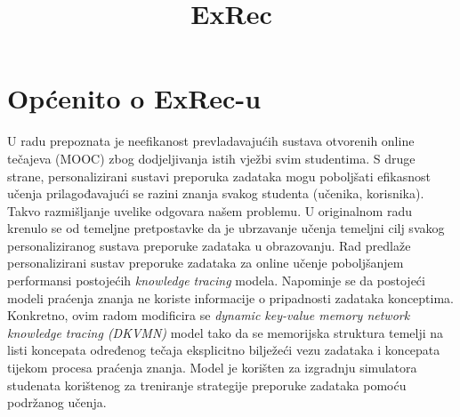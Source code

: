 \documentclass[times, utf8,projekt]{fer}
\begin{document}
\title{ExRec}
\maketitle

\chapter{Općenito o ExRec-u}
U radu \citep{exrec} prepoznata je neefikanost prevladavajućih sustava otvorenih online tečajeva (MOOC) zbog dodjeljivanja istih vježbi svim studentima. S druge strane, personalizirani sustavi preporuka zadataka mogu poboljšati efikasnost učenja prilagođavajući se razini znanja svakog studenta (učenika, korisnika). Takvo razmišljanje uvelike odgovara našem problemu. U originalnom radu krenulo se od temeljne pretpostavke da je ubrzavanje učenja temeljni cilj svakog personaliziranog sustava preporuke zadataka u obrazovanju. Rad predlaže personalizirani sustav preporuke zadataka za online učenje poboljšanjem performansi postojećih \textit{knowledge tracing} modela. Napominje se da postojeći modeli praćenja znanja ne koriste informacije o pripadnosti zadataka konceptima. Konkretno, ovim radom modificira se \textit{dynamic key-value memory network knowledge tracing (DKVMN)} model tako da se memorijska struktura temelji na listi koncepata određenog tečaja eksplicitno bilježeći vezu zadataka i koncepata tijekom procesa praćenja znanja. Model je korišten za izgradnju simulatora studenata korištenog za treniranje strategije preporuke zadataka pomoću podržanog učenja. \newline
\newline
\end{document}
